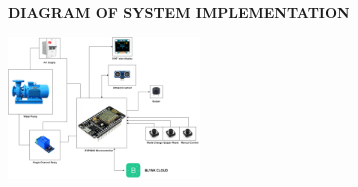 \vspace*{0.6cm}
\begin{center}
    \fontsize{16}{19}\selectfont
    \textbf{DIAGRAM OF SYSTEM IMPLEMENTATION}\\[0.5cm]
\end{center}

\vspace{1cm}
\fontsize{12}{14}\selectfont
\noindent
\vspace{0.3cm}
\includegraphics[width=2in]{diagram.png}
\vspace{0.3cm}
